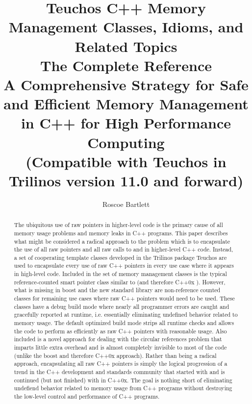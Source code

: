 \documentclass[pdf,ps2pdf,11pt]{SANDreport}
\title{\center
Teuchos C++ Memory Management Classes, Idioms, and Related Topics
\\[2ex] The Complete Reference \\[2ex] {\Large A Comprehensive Strategy for
Safe and Efficient Memory Management in C++ for High Performance
Computing}  \\ {\Large (Compatible with Teuchos in Trilinos version 11.0 and forward)} }
\author{
Roscoe Bartlett
}
\date{}
\begin{document}

\maketitle


%


%
\begin{abstract}
%


The ubiquitous use of raw pointers in higher-level code is the primary
cause of all memory usage problems and memory leaks in C++
programs. This paper describes what might be considered a radical
approach to the problem which is to encapsulate the use of all raw
pointers and all raw calls to {} and {} in
higher-level C++ code.  Instead, a set of cooperating template classes
developed in the Trilinos package Teuchos are used to encapsulate
every use of raw C++ pointers in every use case where it appears in
high-level code.  Included in the set of memory management classes is
the typical reference-counted smart pointer class similar to
{} (and therefore C++0x
{}).  However, what is missing in boost and the
new standard library are non-reference counted classes for remaining
use cases where raw C++ pointers would need to be used.  These classes
have a debug build mode where nearly all programmer errors are caught
and gracefully reported at runtime, i.e. essentially eliminating
undefined behavior related to memory usage.  The default optimized
build mode strips all runtime checks and allows the code to perform as
efficiently as raw C++ pointers with reasonable usage.  Also included
is a novel approach for dealing with the circular references problem
that imparts little extra overhead and is almost completely invisible
to most of the code (unlike the boost and therefore C++0x approach).
Rather than being a radical approach, encapsulating all raw C++
pointers is simply the logical progression of a trend in the C++
development and standards community that started with
{} and is continued (but not finished) with
{} in C++0x.  The goal is nothing short of
eliminating undefiend behavior related to memory usage from C++
programs without destroying the low-level control and performance of
C++ programs.

%
\end{abstract}
%
\end{document}
